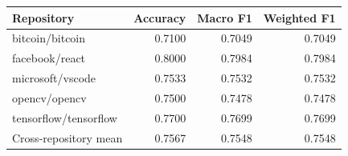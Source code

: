 \begin{tabular}{lrrr}
\toprule
Repository & Accuracy & Macro F1 & Weighted F1 \\
\midrule
bitcoin/bitcoin & 0.7100 & 0.7049 & 0.7049 \\
facebook/react & 0.8000 & 0.7984 & 0.7984 \\
microsoft/vscode & 0.7533 & 0.7532 & 0.7532 \\
opencv/opencv & 0.7500 & 0.7478 & 0.7478 \\
tensorflow/tensorflow & 0.7700 & 0.7699 & 0.7699 \\
Cross-repository mean & 0.7567 & 0.7548 & 0.7548 \\
\bottomrule
\end{tabular}
